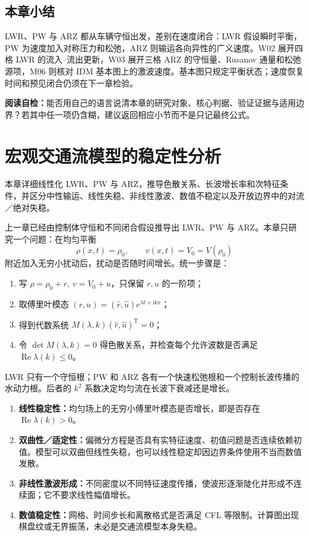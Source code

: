 \documentclass[11pt,a4paper,openany]{book}
\numberwithin{equation}{chapter}
\numberwithin{figure}{chapter}
\numberwithin{table}{chapter}
\newcommand{\sectionwrapup}[1]{%
  \section{本章小结}
  \begin{tcolorbox}[summarybox,title=\textbf{章末回顾}]
  #1
  \par\smallskip
  \textbf{阅读自检：}能否用自己的语言说清本章的研究对象、核心判据、验证证据与适用边界？若其中任一项仍含糊，建议返回相应小节而不是只记最终公式。
  \end{tcolorbox}
  \clearpage
}
\newcommand{\chapterguide}[2]{%
  \begin{tcolorbox}[chapterguide,title=\textbf{本章导学：#1}]
  #2
  \end{tcolorbox}}
\begin{document}
\sectionwrapup{LWR、PW 与 ARZ 都从车辆守恒出发，差别在速度闭合：LWR 假设瞬时平衡，PW 为速度加入对称压力和松弛，ARZ 则输运各向异性的广义速度。W02 展开四格 LWR 的流入--流出更新，W03 展开三格 ARZ 的守恒量、Rusanov 通量和松弛源项，M06 则核对 IDM 基本图上的激波速度。基本图只规定平衡状态；速度恢复时间和预见闭合仍须在下一章检验。}

\chapter{宏观交通流模型的稳定性分析}
\label{sec:macro-stability}
\chapterguide{连续速度场和密度场怎样进行模态稳定性分析}{本章详细线性化 LWR、PW 与 ARZ，推导色散关系、长波增长率和次特征条件，并区分中性输运、线性失稳、非线性激波、数值不稳定以及开放边界中的对流／绝对失稳。}

上一章已经由控制体守恒和不同闭合假设推导出 LWR、PW 与 ARZ。本章只研究一个问题：在均匀平衡
\[
\rho(x,t)=\rho_0,\qquad v(x,t)=V_0=V(\rho_0)
\]
附近加入无穷小扰动后，扰动是否随时间增长。统一步骤是：
\begin{enumerate}[leftmargin=1.6em,itemsep=3pt]
\item 写 $\rho=\rho_0+r,\ v=V_0+u$，只保留 $r,u$ 的一阶项；
\item 取傅里叶模态 $(r,u)=(\hat r,\hat u)e^{\lambda t+\mathrm{i}kx}$；
\item 得到代数系统 $M(\lambda,k)(\hat r,\hat u)^{\mathrm T}=0$；
\item 令 $\det M(\lambda,k)=0$ 得色散关系，并检查每个允许波数是否满足 $\operatorname{Re}\lambda(k)\le0$。
\end{enumerate}
LWR 只有一个守恒根；PW 和 ARZ 各有一个快速松弛根和一个控制长波传播的水动力根。后者的 $k^2$ 系数决定均匀流在长波下衰减还是增长。

\begin{tcolorbox}[notebox,title=\textbf{先分清四种经常被混用的概念}]
\begin{enumerate}[leftmargin=1.5em,itemsep=3pt]
\item \textbf{线性稳定性：}均匀场上的无穷小傅里叶模态是否增长，即是否存在 $\operatorname{Re}\lambda(k)>0$。
\item \textbf{双曲性／适定性：}偏微分方程是否具有实特征速度、初值问题是否连续依赖初值。模型可以双曲但线性失稳，也可以线性稳定却因边界条件使用不当而数值发散。
\item \textbf{非线性激波形成：}不同密度以不同特征速度传播，使波形逐渐陡化并形成不连续面；它不要求线性幅值增长。
\item \textbf{数值稳定性：}网格、时间步长和离散格式是否满足 CFL 等限制。计算图出现棋盘纹或无界振荡，未必是交通流模型本身失稳。
\end{enumerate}
\end{tcolorbox}
\end{document}
